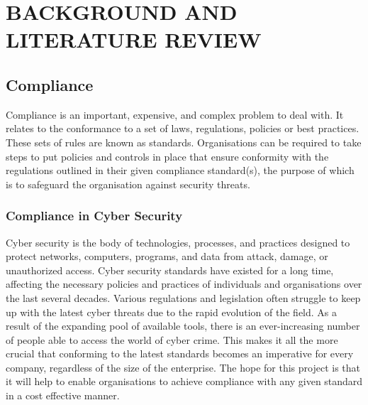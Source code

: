 \chapter{BACKGROUND AND LITERATURE REVIEW}


\section{Compliance}
    Compliance is an important, expensive, and complex problem to deal with. \cite{ComplianceGovernance} It relates to the conformance to a set of laws, regulations, policies or best practices. \cite{ComplianceGovernance} These sets of rules are known as standards. Organisations can be required to take steps to put policies and controls in place that ensure conformity with the regulations outlined in their given compliance standard(s), the purpose of which is to safeguard the organisation against security threats.

    \subsection{Compliance in Cyber Security}
        Cyber security is the body of technologies, processes, and practices designed to protect networks, computers, programs, and data from attack, damage, or unauthorized access. \cite{CSCRM} Cyber security standards have existed for a long time, affecting the necessary policies and practices of individuals and organisations over the last several decades. \cite{StanfordConsortium} Various regulations and legislation often struggle to keep up with the latest cyber threats due to the rapid evolution of the field. \cite{GDPR} As a result of the expanding pool of available tools, there is an ever-increasing number of people able to access the world of cyber crime. This makes it all the more crucial that conforming to the latest standards becomes an imperative for every company, regardless of the size of the enterprise. The hope for this project is that it will help to enable organisations to achieve compliance with any given standard in a cost effective manner.

